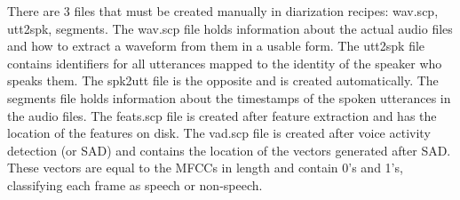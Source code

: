 	There are 3 files that must be created manually in diarization recipes: wav.scp, utt2spk, segments. The wav.scp file holds information about the actual audio files and how to extract a waveform from them in a usable form. The utt2spk file contains identifiers for all utterances mapped to the identity of the speaker who speaks them. The spk2utt file is the opposite and is created automatically. The segments file holds information about the timestamps of the spoken utterances in the audio files. The feats.scp file is created after feature extraction and has the location of the features on disk. The vad.scp file is created after voice activity detection (or SAD) and contains the location of the vectors generated after SAD. These vectors are equal to the MFCCs in length and contain 0's and 1's, classifying each frame as speech or non-speech.

